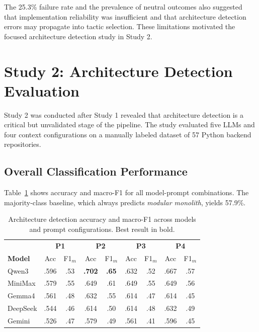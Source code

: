 The 25.3\% failure rate and the prevalence of neutral outcomes also suggested that implementation reliability was insufficient and that architecture detection errors may propagate into tactic selection. These limitations motivated the focused architecture detection study in Study 2.

\section{Study 2: Architecture Detection Evaluation}
\label{sec:eval_arch_detection}

Study 2 was conducted after Study 1 revealed that architecture detection is a critical but unvalidated stage of the pipeline. The study evaluated five LLMs and four context configurations on a manually labeled dataset of 57 Python backend repositories.

\subsection{Overall Classification Performance}
\label{subsec:eval_arch_overall}

Table~\ref{tab:eval_arch_accuracy} shows accuracy and macro-F1 for all model-prompt combinations. The majority-class baseline, which always predicts \textit{modular monolith}, yields 57.9\%.

\begin{table}[H]
\centering
\small
\caption{Architecture detection accuracy and macro-F1 across models and prompt configurations. Best result in bold.}
\label{tab:eval_arch_accuracy}
\begin{tabular}{l|cc|cc|cc|cc}
\toprule
 & \multicolumn{2}{c|}{\textbf{P1}} & \multicolumn{2}{c|}{\textbf{P2}} & \multicolumn{2}{c|}{\textbf{P3}} & \multicolumn{2}{c}{\textbf{P4}} \\
\textbf{Model} & Acc & F1$_m$ & Acc & F1$_m$ & Acc & F1$_m$ & Acc & F1$_m$ \\
\midrule
Qwen3    & .596 & .53 & \textbf{.702} & \textbf{.65} & .632 & .52 & .667 & .57 \\
MiniMax  & .579 & .55 & .649 & .61 & .649 & .55 & .649 & .56 \\
Gemma4   & .561 & .48 & .632 & .55 & .614 & .47 & .614 & .45 \\
DeepSeek & .544 & .46 & .614 & .50 & .614 & .48 & .632 & .49 \\
Gemini   & .526 & .47 & .579 & .49 & .561 & .41 & .596 & .45 \\
\bottomrule
\end{tabular}
\end{table}

